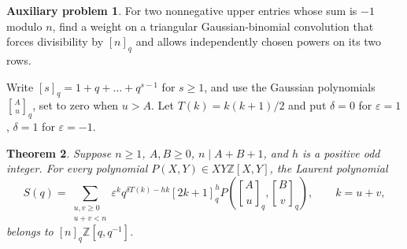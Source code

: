 \documentclass[11pt,a4paper]{article}
\newtheorem{theorem}{Theorem}[section]\newtheorem{lemma}[theorem]{Lemma}
\theoremstyle{definition}\newtheorem{problem}[theorem]{Auxiliary problem}
\theoremstyle{remark}\newtheorem*{remark}{Remark}
\newcommand{\qbin}[2]{\genfrac{[}{]}{0pt}{}{#1}{#2}_{\!q}}
\begin{document}
\begin{problem}
For two nonnegative upper entries whose sum is $-1$ modulo $n$, find a weight on a triangular Gaussian-binomial convolution that forces divisibility by $[n]_q$ and allows independently chosen powers on its two rows.
\end{problem}

Write $[s]_q=1+q+\dots+q^{s-1}$ for $s\ge1$, and use the Gaussian polynomials $\qbin Au$, set to zero when $u>A$. Let $T(k)=k(k+1)/2$ and put $\delta=0$ for $\varepsilon=1$, $\delta=1$ for $\varepsilon=-1$.
\begin{theorem}\label{thm:q}
Suppose $n\ge1$, $A,B\ge0$, $n\mid A+B+1$, and $h$ is a positive odd integer. For every polynomial $P(X,Y)\in XY\mathbb Z[X,Y]$, the Laurent polynomial
\[
 S(q)=\sum_{\substack{u,v\ge0\\u+v<n}}
 \varepsilon^k q^{\delta T(k)-hk}[2k+1]_q^h
       P\!\left(\qbin Au,\qbin Bv\right),\qquad k=u+v,
\]
belongs to $[n]_q\mathbb Z[q,q^{-1}]$.
\end{theorem}
\end{document}
